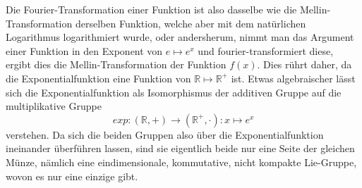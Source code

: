 Die Fourier-Transformation einer Funktion ist also dasselbe wie die 
Mellin-Transformation derselben Funktion, welche aber mit dem natürlichen 
Logarithmus logarithmiert wurde, oder andersherum, nimmt man das 
Argument einer Funktion in den Exponent von $e \mapsto e^x$ und 
fourier-transformiert diese, ergibt dies die Mellin-Transformation 
der Funktion $f(x)$.
Dies rührt daher, da die Exponentialfunktion eine Funktion von 
$\mathbb{R} \mapsto \mathbb{R^+}$ ist.
Etwas algebraischer lässt sich die Exponentialfunktion als Isomorphismus 
der additiven Gruppe auf die multiplikative Gruppe 
\[
exp : (\mathbb{R},+) \to (\mathbb{R^+},\cdot):x \mapsto e^x
\]
verstehen. 
Da sich die beiden Gruppen also über die Exponentialfunktion ineinander 
überführen lassen, sind sie eigentlich beide nur eine Seite der gleichen 
Münze, nämlich eine eindimensionale, kommutative, nicht kompakte Lie-Gruppe, 
wovon es nur eine einzige gibt.
\medskip

